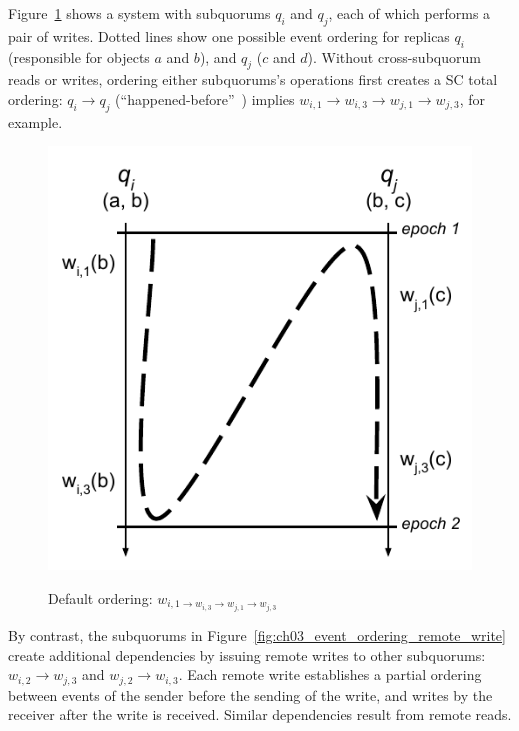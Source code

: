 Figure~\ref{fig:ch03_event_ordering} shows a system with subquorums $q_i$ and $q_j$, each of which performs a pair of writes.
Dotted lines show one possible event ordering for replicas $q_i$ (responsible for objects $a$ and $b$), and $q_j$ ($c$ and $d$).
Without cross-subquorum reads or writes, ordering either
subquorums's operations first creates a SC total ordering: $q_i \rightarrow q_j$ (``happened-before''~\cite{lamport_time_1978})
implies $w_{i,1} \rightarrow w_{i,3} \rightarrow w_{j,1} \rightarrow w_{j,3}$,
for example.

\begin{figure}
    \begin{center}
        \includegraphics[width=5in]{figures/ch03_event_ordering.pdf}
    \end{center}
    \renewcommand{\baselinestretch}{1}
    \small\normalsize

    \begin{quote}
        \caption[Sequential Event Ordering in HC]{Default ordering: $w_{i,1\rightarrow w_{i,3}\rightarrow w_{j,1}\rightarrow w_{j,3}}$}
        \label{fig:ch03_event_ordering}
    \end{quote}
\end{figure}
\renewcommand{\baselinestretch}{2}
\small\normalsize

By contrast, the subquorums in Figure~\ref{fig:ch03_event_ordering_remote_write} create additional dependencies by issuing remote writes to other subquorums: $w_{i,2} \rightarrow w_{j,3}$ and $w_{j,2} \rightarrow w_{i,3}$.
Each remote write establishes a partial ordering between events of the sender before the sending of the write, and writes by the receiver after the write is received.
Similar dependencies result from remote reads.


